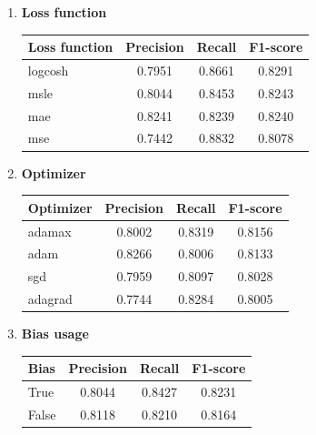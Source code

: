 \begin{enumerate}
    \item \textbf{Loss function}\\
        \vspace{-0.5cm}
        \begin{table}[htbp]
            \centering
            \begin{tabular}{l|c|c|c}
                \textbf{Loss function} & \textbf{Precision} & \textbf{Recall} & \textbf{F1-score} \\ \hline
                    logcosh &	0.7951    &	0.8661    &	0.8291 \\
                    msle    &	0.8044    &	0.8453    &	0.8243 \\
                    mae     &	0.8241    &	0.8239    &	0.8240 \\
                    mse     &	0.7442    &	0.8832    &	0.8078 \\
            \end{tabular}
        \end{table}
        
        
    \item \textbf{Optimizer}\\
        \vspace{-0.5cm}
        \begin{table}[htbp]
            \centering
            \begin{tabular}{l|c|c|c}
                \textbf{Optimizer} & \textbf{Precision} & \textbf{Recall} & \textbf{F1-score} \\ \hline
                    adamax  &	0.8002    &	0.8319    &	0.8156 \\
                    adam    &	0.8266    &	0.8006    &	0.8133 \\
                    sgd     &	0.7959    &	0.8097    &	0.8028 \\
                    adagrad &	0.7744    &	0.8284    &	0.8005 \\
            \end{tabular}
        \end{table}


    \item \textbf{Bias usage}\\
        \vspace{-0.5cm}
        \begin{table}[htbp]
            \centering
            \begin{tabular}{l|c|c|c}
                \textbf{Bias} & \textbf{Precision} & \textbf{Recall} & \textbf{F1-score} \\ \hline
                True    &	0.8044    &	0.8427    &	0.8231 \\
                False   &	0.8118    &	0.8210    &	0.8164 \\
            \end{tabular}
        \end{table}
        
        
    \end{enumerate}


